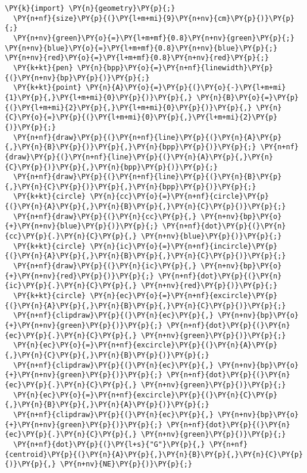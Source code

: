 \begin{Verbatim}[commandchars=\\\{\}]
  \PY{k}{import} \PY{n}{geometry}\PY{p}{;}
  \PY{n+nf}{size}\PY{p}{(}\PY{l+m+mi}{9}\PY{n+nv}{cm}\PY{p}{)}\PY{p}{;}
  \PY{n+nv}{green}\PY{o}{=}\PY{l+m+mf}{0.8}\PY{n+nv}{green}\PY{p}{;} \PY{n+nv}{blue}\PY{o}{=}\PY{l+m+mf}{0.8}\PY{n+nv}{blue}\PY{p}{;} \PY{n+nv}{red}\PY{o}{=}\PY{l+m+mf}{0.8}\PY{n+nv}{red}\PY{p}{;}
  \PY{k+kt}{pen} \PY{n}{bpp}\PY{o}{=}\PY{n+nf}{linewidth}\PY{p}{(}\PY{n+nv}{bp}\PY{p}{)}\PY{p}{;}
  \PY{k+kt}{point} \PY{n}{A}\PY{o}{=}\PY{p}{(}\PY{o}{-}\PY{l+m+mi}{1}\PY{p}{,}\PY{l+m+mi}{0}\PY{p}{)}\PY{p}{,} \PY{n}{B}\PY{o}{=}\PY{p}{(}\PY{l+m+mi}{2}\PY{p}{,}\PY{l+m+mi}{0}\PY{p}{)}\PY{p}{,} \PY{n}{C}\PY{o}{=}\PY{p}{(}\PY{l+m+mi}{0}\PY{p}{,}\PY{l+m+mi}{2}\PY{p}{)}\PY{p}{;}
  \PY{n+nf}{draw}\PY{p}{(}\PY{n+nf}{line}\PY{p}{(}\PY{n}{A}\PY{p}{,}\PY{n}{B}\PY{p}{)}\PY{p}{,}\PY{n}{bpp}\PY{p}{)}\PY{p}{;} \PY{n+nf}{draw}\PY{p}{(}\PY{n+nf}{line}\PY{p}{(}\PY{n}{A}\PY{p}{,}\PY{n}{C}\PY{p}{)}\PY{p}{,}\PY{n}{bpp}\PY{p}{)}\PY{p}{;}
  \PY{n+nf}{draw}\PY{p}{(}\PY{n+nf}{line}\PY{p}{(}\PY{n}{B}\PY{p}{,}\PY{n}{C}\PY{p}{)}\PY{p}{,}\PY{n}{bpp}\PY{p}{)}\PY{p}{;}
  \PY{k+kt}{circle} \PY{n}{cc}\PY{o}{=}\PY{n+nf}{circle}\PY{p}{(}\PY{n}{A}\PY{p}{,}\PY{n}{B}\PY{p}{,}\PY{n}{C}\PY{p}{)}\PY{p}{;}
  \PY{n+nf}{draw}\PY{p}{(}\PY{n}{cc}\PY{p}{,} \PY{n+nv}{bp}\PY{o}{+}\PY{n+nv}{blue}\PY{p}{)}\PY{p}{;} \PY{n+nf}{dot}\PY{p}{(}\PY{n}{cc}\PY{p}{.}\PY{n}{C}\PY{p}{,} \PY{n+nv}{blue}\PY{p}{)}\PY{p}{;}
  \PY{k+kt}{circle} \PY{n}{ic}\PY{o}{=}\PY{n+nf}{incircle}\PY{p}{(}\PY{n}{A}\PY{p}{,}\PY{n}{B}\PY{p}{,}\PY{n}{C}\PY{p}{)}\PY{p}{;}
  \PY{n+nf}{draw}\PY{p}{(}\PY{n}{ic}\PY{p}{,} \PY{n+nv}{bp}\PY{o}{+}\PY{n+nv}{red}\PY{p}{)}\PY{p}{;} \PY{n+nf}{dot}\PY{p}{(}\PY{n}{ic}\PY{p}{.}\PY{n}{C}\PY{p}{,} \PY{n+nv}{red}\PY{p}{)}\PY{p}{;}
  \PY{k+kt}{circle} \PY{n}{ec}\PY{o}{=}\PY{n+nf}{excircle}\PY{p}{(}\PY{n}{A}\PY{p}{,}\PY{n}{B}\PY{p}{,}\PY{n}{C}\PY{p}{)}\PY{p}{;}
  \PY{n+nf}{clipdraw}\PY{p}{(}\PY{n}{ec}\PY{p}{,} \PY{n+nv}{bp}\PY{o}{+}\PY{n+nv}{green}\PY{p}{)}\PY{p}{;} \PY{n+nf}{dot}\PY{p}{(}\PY{n}{ec}\PY{p}{.}\PY{n}{C}\PY{p}{,} \PY{n+nv}{green}\PY{p}{)}\PY{p}{;}
  \PY{n}{ec}\PY{o}{=}\PY{n+nf}{excircle}\PY{p}{(}\PY{n}{A}\PY{p}{,}\PY{n}{C}\PY{p}{,}\PY{n}{B}\PY{p}{)}\PY{p}{;}
  \PY{n+nf}{clipdraw}\PY{p}{(}\PY{n}{ec}\PY{p}{,} \PY{n+nv}{bp}\PY{o}{+}\PY{n+nv}{green}\PY{p}{)}\PY{p}{;} \PY{n+nf}{dot}\PY{p}{(}\PY{n}{ec}\PY{p}{.}\PY{n}{C}\PY{p}{,} \PY{n+nv}{green}\PY{p}{)}\PY{p}{;}
  \PY{n}{ec}\PY{o}{=}\PY{n+nf}{excircle}\PY{p}{(}\PY{n}{C}\PY{p}{,}\PY{n}{B}\PY{p}{,}\PY{n}{A}\PY{p}{)}\PY{p}{;}
  \PY{n+nf}{clipdraw}\PY{p}{(}\PY{n}{ec}\PY{p}{,} \PY{n+nv}{bp}\PY{o}{+}\PY{n+nv}{green}\PY{p}{)}\PY{p}{;} \PY{n+nf}{dot}\PY{p}{(}\PY{n}{ec}\PY{p}{.}\PY{n}{C}\PY{p}{,} \PY{n+nv}{green}\PY{p}{)}\PY{p}{;}
  \PY{n+nf}{dot}\PY{p}{(}\PY{l+s}{"G"}\PY{p}{,} \PY{n+nf}{centroid}\PY{p}{(}\PY{n}{A}\PY{p}{,}\PY{n}{B}\PY{p}{,}\PY{n}{C}\PY{p}{)}\PY{p}{,} \PY{n+nv}{NE}\PY{p}{)}\PY{p}{;}
\end{Verbatim}
